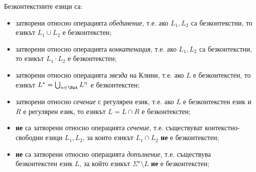 Безконтекстните езици са:
\begin{itemize}
\item 
  затворени относно операцията {\em обединение}, т.е.
  ако $L_1, L_2$ са безконтекстни, то езикът $L_1 \cup L_2$ е безконтекстен; 
\item
  затворени относно операцията {\em конкатенация}, т.е.
  ако $L_1, L_2$ са безконтекстни, то езикът $L_1 \cdot L_2$ е безконтекстен; 
\item
  затворени относно операцията {\em звезда} на Клини, т.е.
  ако $L$ е безконтекстен, то езикът $L^\star = \bigcup_{n\in\Nat} L^n$ е безконтекстен; 
\item
  затворени относно {\em сечение} с регулярен език, т.е.
  ако $L$ е безконтекстен език и $R$ е регулярен език, то езикът $L = L \cap R$ е безконтекстен; 
\item
  {\bf не} са затворени относно операцията {\em сечение}, т.е.
  съществуват контекстно-свободни езици $L_1, L_2$, за които езикът $L_1 \cap L_2$ {\bf не} е безконтекстен; 
\item
  {\bf не} са затворени относно операцията {\em допълнение}, т.е.
  съществува безконтекстен език $L$, за който езикът $\Sigma^\star\setminus L$ {\bf не} е безконтекстен; 
\end{itemize}

